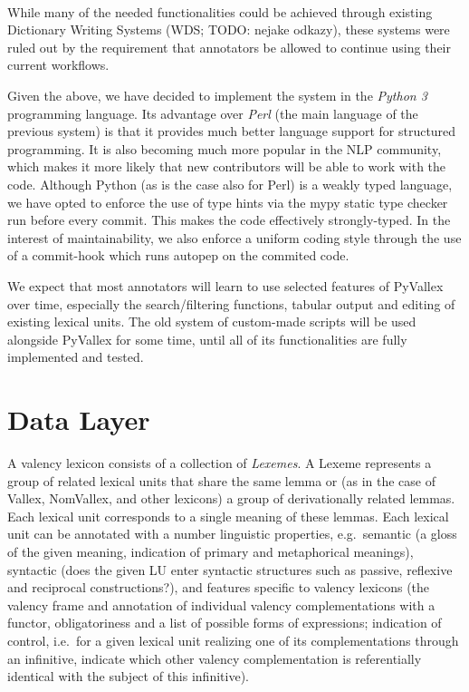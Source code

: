 \documentclass[10pt, a4paper]{article}
\begin{document}
\paragraph{} While many of the needed functionalities could be achieved through existing Dictionary Writing Systems
(WDS; TODO: nejake odkazy), these systems were ruled out by the requirement that annotators be allowed
to continue using their current workflows.

Given the above, we have decided to implement the system in the \emph{Python 3} programming
language. Its advantage over \emph{Perl} (the main language of the previous system) is that it provides
much better language support for structured programming. It is also becoming much more popular in
the NLP community, which makes it more likely that new contributors will be able to work with the
code. Although Python (as is the case also for Perl) is a weakly typed language, we have opted
to enforce the use of type hints via the mypy static type checker \cite{tool:mypy} run before every commit.
This makes the code effectively strongly-typed. In the interest of maintainability, we also enforce
a uniform coding style through the use of a commit-hook which runs autopep \cite{tool:autopep8}
on the commited code.

We expect that most annotators will learn to use selected features of PyVallex over time, especially the search/filtering functions, tabular output and editing of existing lexical units.
The old system of custom-made scripts will be used alongside PyVallex for some time, until all of its functionalities are fully implemented and tested.


\section{Data Layer}
A valency lexicon consists of a collection of \emph{Lexemes}. A Lexeme represents a group of related
lexical units that share the same lemma or (as in the case of Vallex, NomVallex, and other lexicons) a group of derivationally related lemmas. Each lexical unit corresponds to a single meaning of these lemmas. Each lexical unit can be annotated
with a number linguistic properties,
e.g.\
semantic (a gloss of the given meaning,
indication of primary and metaphorical meanings),
syntactic (does the given LU enter syntactic structures such as passive, reflexive and reciprocal constructions?),
and features specific to valency lexicons
(the valency frame and annotation of individual valency complementations with a functor, obligatoriness and a list of possible forms of expressions;
indication of control, i.e.\ for a given lexical unit realizing one of its complementations through an infinitive,
indicate which other valency complementation is referentially identical with the subject of this infinitive).
\end{document}
